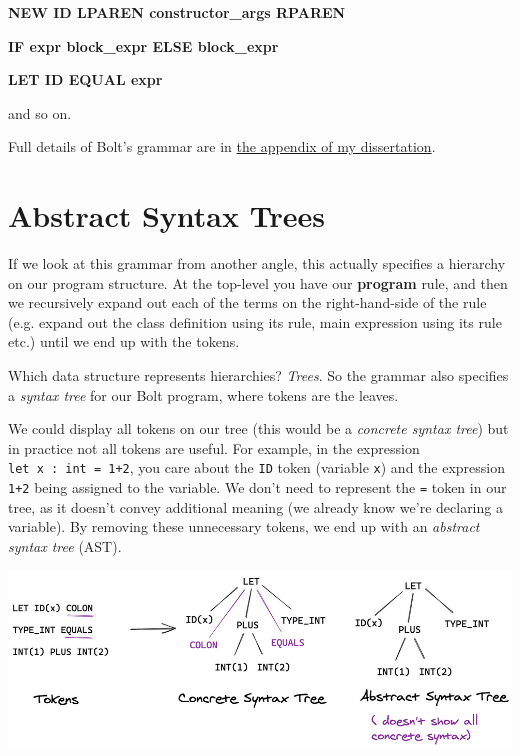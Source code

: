 \textbf{\textbar{} NEW ID LPAREN constructor\_args RPAREN}

\textbf{\textbar{} IF expr block\_expr ELSE block\_expr}

\textbf{\textbar{} LET ID EQUAL expr}

and so on.

Full details of Bolt's grammar are in
\href{https://github.com/mukul-rathi/bolt-dissertation/blob/master/dissertation.pdf}{the
appendix of my dissertation}.

\hypertarget{abstract-syntax-trees}{%
\section{\texorpdfstring{\protect\hyperlink{abstract-syntax-trees}{}Abstract
Syntax Trees}{Abstract Syntax Trees}}\label{abstract-syntax-trees}}

If we look at this grammar from another angle, this actually specifies a
hierarchy on our program structure. At the top-level you have our
\textbf{program} rule, and then we recursively expand out each of the
terms on the right-hand-side of the rule (e.g. expand out the class
definition using its rule, main expression using its rule etc.) until we
end up with the tokens.

Which data structure represents hierarchies? \emph{Trees}. So the
grammar also specifies a \emph{syntax tree} for our Bolt program, where
tokens are the leaves.

We could display all tokens on our tree (this would be a \emph{concrete
syntax tree}) but in practice not all tokens are useful. For example, in
the expression \texttt{let\ x\ :\ int\ =\ 1+2}, you care about the
\texttt{ID} token (variable \texttt{x}) and the expression \texttt{1+2}
being assigned to the variable. We don't need to represent the
\texttt{=} token in our tree, as it doesn't convey additional meaning
(we already know we're declaring a variable). By removing these
unnecessary tokens, we end up with an \emph{abstract syntax tree} (AST).

{
\href{https://mukulrathi.com/static/60bd02e28678a6745cea6186af1f8d1b/0da74/concrete-vs-ast.png}{{}
\includegraphics[width=\linewidth]{03_files/concrete-vs-ast.png}} }

